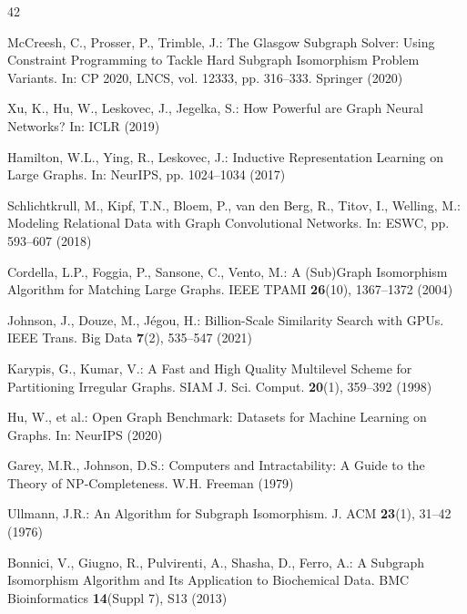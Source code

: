 \documentclass{article}
\begin{document}
{\small
\setlength{\bibsep}{0pt}
\begin{thebibliography}{42}

McCreesh, C., Prosser, P., Trimble, J.: The Glasgow Subgraph Solver: Using Constraint Programming to Tackle Hard Subgraph Isomorphism Problem Variants. In: CP 2020, LNCS, vol. 12333, pp. 316--333. Springer (2020)

Xu, K., Hu, W., Leskovec, J., Jegelka, S.: How Powerful are Graph Neural Networks? In: ICLR (2019)

Hamilton, W.L., Ying, R., Leskovec, J.: Inductive Representation Learning on Large Graphs. In: NeurIPS, pp. 1024--1034 (2017)

Schlichtkrull, M., Kipf, T.N., Bloem, P., van den Berg, R., Titov, I., Welling, M.: Modeling Relational Data with Graph Convolutional Networks. In: ESWC, pp. 593--607 (2018)

Cordella, L.P., Foggia, P., Sansone, C., Vento, M.: A (Sub)Graph Isomorphism Algorithm for Matching Large Graphs. IEEE TPAMI \textbf{26}(10), 1367--1372 (2004)

Johnson, J., Douze, M., J\'egou, H.: Billion-Scale Similarity Search with GPUs. IEEE Trans. Big Data \textbf{7}(2), 535--547 (2021)

Karypis, G., Kumar, V.: A Fast and High Quality Multilevel Scheme for Partitioning Irregular Graphs. SIAM J. Sci. Comput. \textbf{20}(1), 359--392 (1998)

Hu, W., et al.: Open Graph Benchmark: Datasets for Machine Learning on Graphs. In: NeurIPS (2020)

Garey, M.R., Johnson, D.S.: Computers and Intractability: A Guide to the Theory of NP-Completeness. W.H. Freeman (1979)

Ullmann, J.R.: An Algorithm for Subgraph Isomorphism. J. ACM \textbf{23}(1), 31--42 (1976)

Bonnici, V., Giugno, R., Pulvirenti, A., Shasha, D., Ferro, A.: A Subgraph Isomorphism Algorithm and Its Application to Biochemical Data. BMC Bioinformatics \textbf{14}(Suppl 7), S13 (2013)


\end{thebibliography}}
\end{document}
